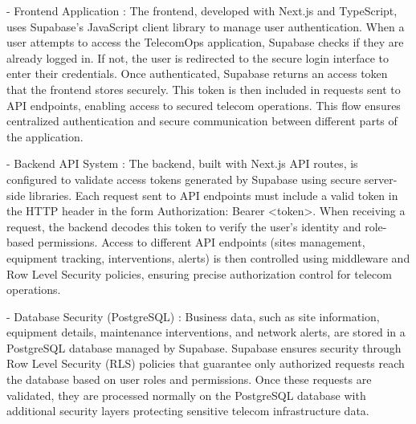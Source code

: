 - Frontend Application : 
\vspace{0.2cm}
\newline
The frontend, developed with Next.js and TypeScript, uses Supabase's JavaScript client library to manage user authentication. When a user attempts to access the TelecomOps application, Supabase checks if they are already logged in. If not, the user is redirected to the secure login interface to enter their credentials. Once authenticated, Supabase returns an access token that the frontend stores securely. This token is then included in requests sent to API endpoints, enabling access to secured telecom operations. This flow ensures centralized authentication and secure communication between different parts of the application.
\vspace{0.5cm} 
\newline

- Backend API System : 
\vspace{0.2cm}
\newline
The backend, built with Next.js API routes, is configured to validate access tokens generated by Supabase using secure server-side libraries. Each request sent to API endpoints must include a valid token in the HTTP header in the form Authorization: Bearer <token>. When receiving a request, the backend decodes this token to verify the user's identity and role-based permissions. Access to different API endpoints (sites management, equipment tracking, interventions, alerts) is then controlled using middleware and Row Level Security policies, ensuring precise authorization control for telecom operations.
\vspace{0.5cm} 
\newline

- Database Security (PostgreSQL) :
\vspace{0.2cm}
\newline
Business data, such as site information, equipment details, maintenance interventions, and network alerts, are stored in a PostgreSQL database managed by Supabase. Supabase ensures security through Row Level Security (RLS) policies that guarantee only authorized requests reach the database based on user roles and permissions. Once these requests are validated, they are processed normally on the PostgreSQL database with additional security layers protecting sensitive telecom infrastructure data.

